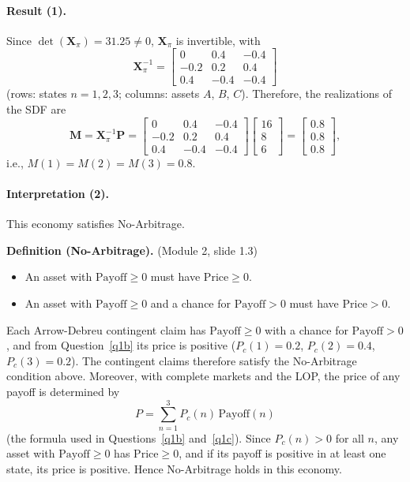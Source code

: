 \documentclass[11pt]{article}
\begin{document}
\paragraph{Result (1).}
Since $\det(\mathbf{X}_\pi) = 31.25 \neq 0$, $\mathbf{X}_\pi$ is invertible, with
\[
  \mathbf{X}_\pi^{-1} = \begin{bmatrix} 0 & 0.4 & -0.4 \\ -0.2 & 0.2 & 0.4 \\ 0.4 & -0.4 & -0.4 \end{bmatrix}
\]
(rows: states $n = 1, 2, 3$; columns: assets $A$, $B$, $C$). Therefore, the realizations of the SDF are
\[
  \mathbf{M} = \mathbf{X}_\pi^{-1}\mathbf{P}
  = \begin{bmatrix} 0 & 0.4 & -0.4 \\ -0.2 & 0.2 & 0.4 \\ 0.4 & -0.4 & -0.4 \end{bmatrix}
    \begin{bmatrix} 16 \\ 8 \\ 6 \end{bmatrix}
  = \begin{bmatrix} 0.8 \\ 0.8 \\ 0.8 \end{bmatrix},
\]
i.e., $M(1) = M(2) = M(3) = 0.8$.

\paragraph{Interpretation (2).}
This economy satisfies No-Arbitrage.

\textbf{Definition (No-Arbitrage).} (Module 2, slide 1.3)
\begin{itemize}
  \item An asset with $\mathrm{Payoff} \geq 0$ must have $\mathrm{Price} \geq 0$.
  \item An asset with $\mathrm{Payoff} \geq 0$ and a chance for $\mathrm{Payoff} > 0$ must have
    $\mathrm{Price} > 0$.
\end{itemize}

Each Arrow-Debreu contingent claim has $\mathrm{Payoff} \geq 0$ with a chance for $\mathrm{Payoff} > 0$,
and from Question~\ref{q1b} its price is positive ($P_c(1) = 0.2$, $P_c(2) = 0.4$, $P_c(3) = 0.2$). The
contingent claims therefore satisfy the No-Arbitrage condition above. Moreover, with complete markets and the
LOP, the price of any payoff is determined by
\[
  P = \sum_{n=1}^{3} P_c(n)\,\mathrm{Payoff}(n)
\]
(the formula used in Questions~\ref{q1b} and~\ref{q1c}). Since $P_c(n) > 0$ for all $n$, any asset with
$\mathrm{Payoff} \geq 0$ has $\mathrm{Price} \geq 0$, and if its payoff is positive in at least one state,
its price is positive. Hence No-Arbitrage holds in this economy.
\end{document}
